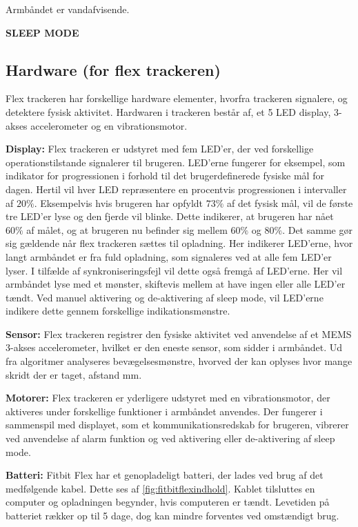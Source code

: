 Armbåndet er vandafvisende.

\textbf{SLEEP MODE}


\subsection{Hardware (for flex trackeren)}
Flex trackeren har forskellige hardware elementer, hvorfra trackeren signalere, og detektere fysisk aktivitet. Hardwaren i trackeren består af, et 5 LED display, 3-akses accelerometer og en vibrationsmotor.
 
\textbf{Display:} 
Flex trackeren er udstyret med fem LED'er, der ved forskellige operationstilstande signalerer til brugeren. 
LED'erne fungerer for eksempel, som indikator for progressionen i forhold til det brugerdefinerede fysiske mål for dagen. Hertil vil hver LED repræsentere en procentvis progressionen i intervaller af $20 \%$. Eksempelvis hvis brugeren har opfyldt $73 \%$ af det fysisk mål, vil de første tre LED'er lyse og den fjerde vil blinke. Dette indikerer, at brugeren har nået $60 \%$ af målet, og at brugeren nu befinder sig mellem $60 \%$ og $80 \%$. 
Det samme gør sig gældende når flex trackeren sættes til opladning. Her indikerer LED'erne, hvor langt armbåndet er fra fuld opladning, som signaleres ved at alle fem LED'er lyser. 
I tilfælde af synkroniseringsfejl vil dette også fremgå af LED'erne. Her vil armbåndet lyse med et mønster, skiftevis mellem at have ingen eller alle LED'er tændt. 
Ved manuel aktivering og de-aktivering af sleep mode, vil LED'erne indikere dette gennem forskellige indikationsmønstre.

\textbf{Sensor:} 
Flex trackeren registrer den fysiske aktivitet ved anvendelse af et MEMS 3-akses accelerometer, hvilket er den eneste sensor, som sidder i armbåndet. Ud fra algoritmer analyseres bevægelsesmønstre, hvorved der kan oplyses hvor mange skridt der er taget, afstand mm. 

\textbf{Motorer:}
Flex trackeren er yderligere udstyret med en vibrationsmotor, der aktiveres under forskellige funktioner i armbåndet anvendes. Der fungerer i sammenspil med displayet, som et kommunikationsredskab for brugeren, vibrerer ved anvendelse af alarm funktion og ved aktivering eller de-aktivering af sleep mode. 
 
\textbf{Batteri:} 
Fitbit Flex har et genopladeligt batteri, der lades ved brug af det medfølgende kabel. Dette ses af \autoref{fig:fitbitflexindhold}. Kablet tilsluttes en computer og opladningen begynder, hvis computeren er tændt. 
Levetiden på batteriet rækker op til 5 dage, dog kan mindre forventes ved omstændigt brug.


